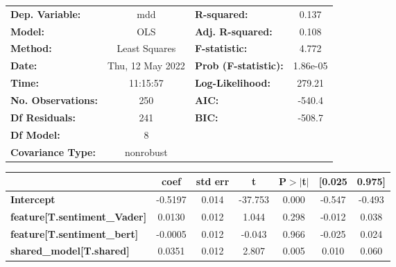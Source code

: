 \begin{center}
\begin{tabular}{lclc}
\toprule
\textbf{Dep. Variable:}                       &       mdd        & \textbf{  R-squared:         } &     0.137   \\
\textbf{Model:}                               &       OLS        & \textbf{  Adj. R-squared:    } &     0.108   \\
\textbf{Method:}                              &  Least Squares   & \textbf{  F-statistic:       } &     4.772   \\
\textbf{Date:}                                & Thu, 12 May 2022 & \textbf{  Prob (F-statistic):} &  1.86e-05   \\
\textbf{Time:}                                &     11:15:57     & \textbf{  Log-Likelihood:    } &    279.21   \\
\textbf{No. Observations:}                    &         250      & \textbf{  AIC:               } &    -540.4   \\
\textbf{Df Residuals:}                        &         241      & \textbf{  BIC:               } &    -508.7   \\
\textbf{Df Model:}                            &           8      & \textbf{                     } &             \\
\textbf{Covariance Type:}                     &    nonrobust     & \textbf{                     } &             \\
\bottomrule
\end{tabular}
\begin{tabular}{lcccccc}
                                              & \textbf{coef} & \textbf{std err} & \textbf{t} & \textbf{P$> |$t$|$} & \textbf{[0.025} & \textbf{0.975]}  \\
\midrule
\textbf{Intercept}                            &      -0.5197  &        0.014     &   -37.753  &         0.000        &       -0.547    &       -0.493     \\
\textbf{feature[T.sentiment\_Vader]}          &       0.0130  &        0.012     &     1.044  &         0.298        &       -0.012    &        0.038     \\
\textbf{feature[T.sentiment\_bert]}           &      -0.0005  &        0.012     &    -0.043  &         0.966        &       -0.025    &        0.024     \\
\textbf{shared\_model[T.shared]}              &       0.0351  &        0.012     &     2.807  &         0.005        &        0.010    &        0.060     \\

\end{tabular}
\end{center}
